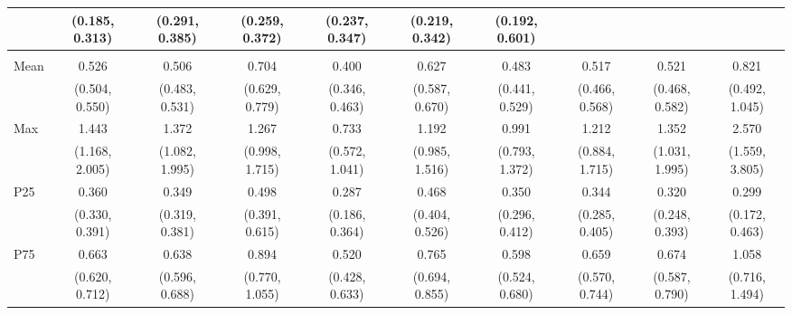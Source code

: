 {\begin{tabular}{l|c|c|c|c|c|c|c|c|c}
& {\scriptsize (0.185, 0.313)}
& {\scriptsize (0.291, 0.385)}
& {\scriptsize (0.259, 0.372)}
& {\scriptsize (0.237, 0.347)}
& {\scriptsize (0.219, 0.342)}
& {\scriptsize (0.192, 0.601)}
\\ [0.1cm]
\hline
\noalign{\smallskip}
\multicolumn{10}{l}{\textbf{Effect with Leads and Lags}} \\
\noalign{\smallskip}
\hline
Mean
& 0.526 & 0.506 & 0.704 & 0.400 & 0.627 & 0.483 & 0.517 & 0.521 & 0.821 \\
& {\scriptsize (0.504, 0.550)}
& {\scriptsize (0.483, 0.531)}
& {\scriptsize (0.629, 0.779)}
& {\scriptsize (0.346, 0.463)}
& {\scriptsize (0.587, 0.670)}
& {\scriptsize (0.441, 0.529)}
& {\scriptsize (0.466, 0.568)}
& {\scriptsize (0.468, 0.582)}
& {\scriptsize (0.492, 1.045)}
\\ [0.1cm]
\hline
Max
& 1.443 & 1.372 & 1.267 & 0.733 & 1.192 & 0.991 & 1.212 & 1.352 & 2.570 \\
& {\scriptsize (1.168, 2.005)}
& {\scriptsize (1.082, 1.995)}
& {\scriptsize (0.998, 1.715)}
& {\scriptsize (0.572, 1.041)}
& {\scriptsize (0.985, 1.516)}
& {\scriptsize (0.793, 1.372)}
& {\scriptsize (0.884, 1.715)}
& {\scriptsize (1.031, 1.995)}
& {\scriptsize (1.559, 3.805)}
\\ [0.1cm]
\hline
P25
& 0.360 & 0.349 & 0.498 & 0.287 & 0.468 & 0.350 & 0.344 & 0.320 & 0.299 \\
& {\scriptsize (0.330, 0.391)}
& {\scriptsize (0.319, 0.381)}
& {\scriptsize (0.391, 0.615)}
& {\scriptsize (0.186, 0.364)}
& {\scriptsize (0.404, 0.526)}
& {\scriptsize (0.296, 0.412)}
& {\scriptsize (0.285, 0.405)}
& {\scriptsize (0.248, 0.393)}
& {\scriptsize (0.172, 0.463)}
\\ [0.1cm]
\hline
P75
& 0.663 & 0.638 & 0.894 & 0.520 & 0.765 & 0.598 & 0.659 & 0.674 & 1.058 \\
& {\scriptsize (0.620, 0.712)}
& {\scriptsize (0.596, 0.688)}
& {\scriptsize (0.770, 1.055)}
& {\scriptsize (0.428, 0.633)}
& {\scriptsize (0.694, 0.855)}
& {\scriptsize (0.524, 0.680)}
& {\scriptsize (0.570, 0.744)}
& {\scriptsize (0.587, 0.790)}
& {\scriptsize (0.716, 1.494)}
\\ [0.1cm]
\hline
\hline
\end{tabular}
}
